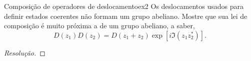 \begin{exercício}{Composição de operadores de deslocamento}{ex2}
    Os deslocamentos usados para definir estados coerentes não formam um grupo abeliano. Mostre que sua lei de composição é muito próxima a de um grupo abeliano, a saber,
    \begin{equation*}
       D(z_1) D(z_2) = D(z_1 + z_2) \exp\left[i \Im(z_1 z_2^*)\right].
    \end{equation*}
\end{exercício}
\begin{proof}[Resolução]
    
\end{proof}
